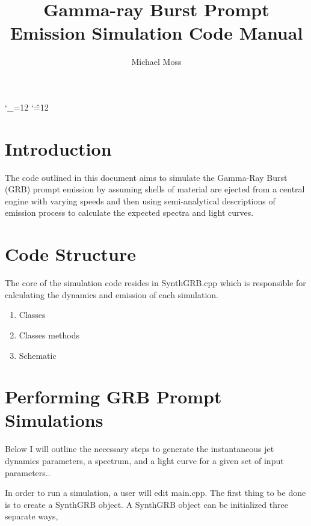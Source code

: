 \documentclass[linenumbers]{aastex631}
\def\upsubscripts{\catcode`\_=12 } \def\normalsubscripts{\catcode`\_=8 }
\def\upsupscripts{\catcode`\^=12 } \def\normalsupscripts{\catcode`\^=7 }
\begin{document}
\upsubscripts
\upsupscripts

\title{Gamma-ray Burst Prompt Emission Simulation Code Manual}

\author{Michael Moss}



\tableofcontents

\newpage
\section{Introduction}

The code outlined in this document aims to simulate the Gamma-Ray Burst (GRB) prompt emission by assuming shells of material are ejected from a central engine with varying speeds and then using semi-analytical descriptions of emission process to calculate the expected spectra and light curves.

\section{Code Structure}

The core of the simulation code resides in SynthGRB.cpp which is responsible for calculating the dynamics and emission of each simulation. 

\begin{enumerate}
    \item Classes
    \item Classes methods
    \item Schematic
\end{enumerate}

\section{Performing GRB Prompt Simulations} \label{sec: simulations}

Below I will outline the necessary steps to generate the instantaneous jet dynamics parameters, a spectrum, and a light curve for a given set of input parameters..

In order to run a simulation, a user will edit main.cpp. The first thing to be done is to create a SynthGRB object. A SynthGRB object can be initialized three separate ways, 
\end{document}
